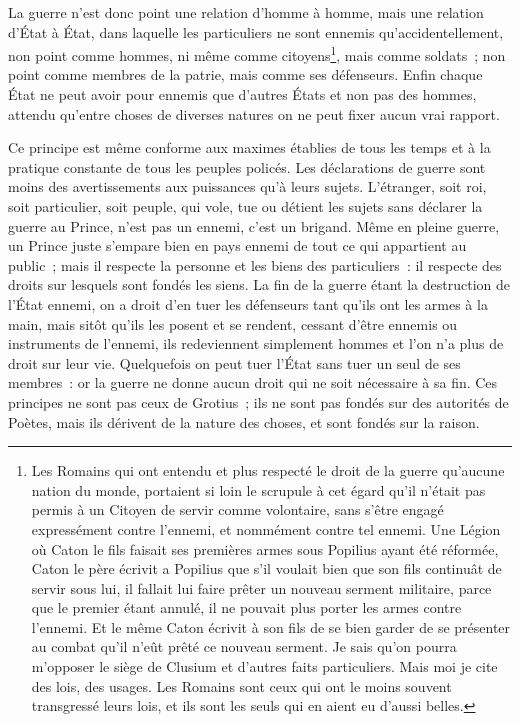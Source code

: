 \documentclass[french,twoside]{book} %
\begin{document}
La guerre n’est donc point une relation d’homme à homme, mais une relation d’État à État, dans laquelle les particuliers ne sont ennemis qu’accidentellement, non point comme hommes, ni même comme citoyens\footnote{Les Romains qui ont entendu et plus respecté le droit de la guerre qu’aucune nation du monde, portaient si loin le scrupule à cet égard qu’il n’était pas permis à un Citoyen de servir comme volontaire, sans s’être engagé expressément contre l’ennemi, et nommément contre tel ennemi. Une Légion où Caton le fils faisait ses premières armes sous Popilius ayant été réformée, Caton le père écrivit a Popilius que s’il voulait bien que son fils continuât de servir sous lui, il fallait lui faire prêter un nouveau serment militaire, parce que le premier étant annulé, il ne pouvait plus porter les armes contre l’ennemi. Et le même Caton écrivit à son fils de se bien garder de se présenter au combat qu’il n’eût prêté ce nouveau serment. Je sais qu’on pourra m’opposer le siège de Clusium et d’autres faits particuliers. Mais moi je cite des lois, des usages. Les Romains sont ceux qui ont le moins souvent transgressé leurs lois, et ils sont les seuls qui en aient eu d’aussi belles.}, mais comme soldats ; non point comme membres de la patrie, mais comme ses défenseurs. Enfin chaque État ne peut avoir pour ennemis que d’autres États et non pas des hommes, attendu qu’entre choses de diverses natures on ne peut fixer aucun vrai rapport.\par
Ce principe est même conforme aux maximes établies de tous les temps et à la pratique constante de tous les peuples policés. Les déclarations de guerre sont moins des avertissements aux puissances qu’à leurs sujets. L’étranger, soit roi, soit particulier, soit peuple, qui vole, tue ou détient les sujets sans déclarer la guerre au Prince, n’est pas un ennemi, c’est un brigand. Même en pleine guerre, un Prince juste s’empare bien en pays ennemi de tout ce qui appartient au public ; mais il respecte la personne et les biens des particuliers : il respecte des droits sur lesquels sont fondés les siens. La fin de la guerre étant la destruction de l’État ennemi, on a droit d’en tuer les défenseurs tant qu’ils ont les armes à la main, mais sitôt qu’ils les posent et se rendent, cessant d’être ennemis ou instruments de l’ennemi, ils redeviennent simplement hommes et l’on n’a plus de droit sur leur vie. Quelquefois on peut tuer l’État sans tuer un seul de ses membres : or la guerre ne donne aucun droit qui ne soit nécessaire à sa fin. Ces principes ne sont pas ceux de Grotius ; ils ne sont pas fondés sur des autorités de Poètes, mais ils dérivent de la nature des choses, et sont fondés sur la raison.\par
\end{document}
